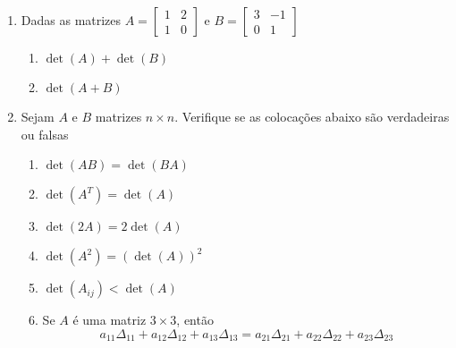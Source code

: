 \documentclass{article}
\begin{document}
\begin{enumerate}

\item Dadas as matrizes $A = 
\left[\begin{array}{cc}
	1 & 2 \\
	1 & 0
\end{array}\right]$ e $B =
\left[\begin{array}{cc}
	3 & -1 \\
	0 & 1
\end{array}\right]$

\begin{enumerate}[label=\alph*.]
	\item $\det(A) + \det(B)$
	\item $\det(A + B)$
\end{enumerate}

\item Sejam $A$ e $B$ matrizes $n \times{} n$. Verifique se as coloca\c{c}\~oes abaixo s\~ao verdadeiras ou falsas

\begin{enumerate}[label=\alph*.]
	\item $\det(AB) = \det(BA)$
	\item $\det({A^T}) = \det(A)$
	\item $\det(2A) = 2\det(A)$
	\item $\det({A^2}) = (\det(A))^2$
	\item $\det(A_{ij}) < \det(A)$
	\item Se $A$ \'e uma matriz $3 \times{} 3$, ent\~ao
		$$a_{11}\Delta_{11} + a_{12}\Delta_{12} + a_{13}\Delta_{13} = a_{21}\Delta_{21} + a_{22}\Delta_{22} + a_{23}\Delta_{23}$$
\end{enumerate}

\end{enumerate}
\end{document}
